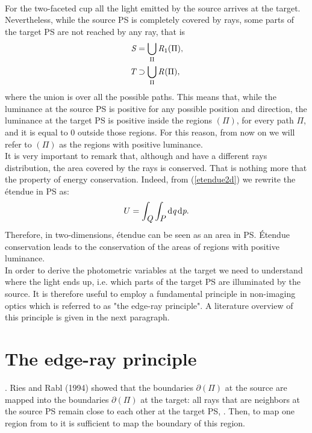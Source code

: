 \\ \indent For the two-faceted cup all the light emitted by the source arrives at the target. Nevertheless, while the source PS is completely covered by rays, some parts of the target PS are not reached by any ray, that is
\begin{equation}
\begin{aligned}
\mbox{$\emph{S}_{\textit{}}$} &= \bigcup_{\Pi} \mbox{$\emph{R}_{\textit{$1$}}$}(\Pi),\\
\mbox{$\emph{T}_{\textit{}}$} &\supset \bigcup_{\Pi} \mbox{$\emph{R}_{\textit{}}$}(\Pi),
\end{aligned}
\end{equation}
where the union is over all the possible paths.
This means that, while the luminance at the source PS is positive for any possible position and direction, the luminance at the target PS is positive inside the regions $(\Pi)$, for every path $\Pi$, and it is equal to $0$ outside those regions. For this reason, from now on we will refer to $(\Pi)$ as the regions with positive luminance.\\ \indent
It is very important to remark that, although  and  have a different rays distribution, the area covered by the rays is conserved. That is nothing more that the property of energy conservation. Indeed, from (\ref{etendue2d}) we rewrite the \'{e}tendue in PS as:
\begin{equation}
U = \int_{\mbox{$\emph{Q}_{\textit{}}$}}\int_{\mbox{$\emph{P}_{\textit{}}$}} \textrm{d}\textit{q}\,\textrm{d}\textit{p}.
\end{equation}
Therefore, in two-dimensions, \'{e}tendue can be seen as an area in PS.  \'{E}tendue conservation leads to the conservation of the areas of regions with positive luminance.\\ \indent
In order to derive the photometric variables at the target we need to understand where the light ends up, i.e. which parts of the target PS are illuminated by the source.
It is therefore useful to employ a fundamental principle in non-imaging optics which is referred to as "the edge-ray principle". A literature overview of this principle is given in the next paragraph.
\section{The edge-ray principle}
\cite{welford1978problem}.
Ries and Rabl (1994) showed that the boundaries
$\partial$$(\Pi)$ at the source are mapped into the boundaries $\partial$$(\Pi)$ at the target:
all rays that are neighbors at the source PS remain close to each other at the target PS, \cite{Ries:2}.
Then, to map one region from  to  it is sufficient to map the boundary of this region.
